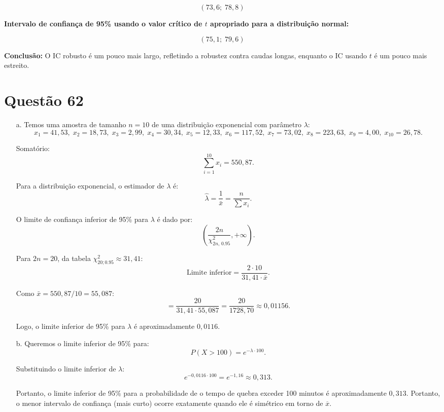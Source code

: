 \documentclass[12pt]{article}
\newcommand{\quest}[1]{\section*{Questão #1}} %
\begin{document}
\[
(73,6;\; 78,8)
\]

\textbf{Intervalo de confiança de 95\% usando o valor crítico de \(t\) apropriado para a distribuição normal:}

\[
(75,1;\; 79,6)
\]

\textbf{Conclusão:} O IC robusto é um pouco mais largo, refletindo a robustez contra caudas longas, enquanto o IC usando \(t\) é um pouco mais estreito.


\quest{62}

\begin{enumerate}
    \item[a.] Temos uma amostra de tamanho \(n=10\) de uma distribuição exponencial com parâmetro \(\lambda\):
    \[
    x_1=41,53,\; x_2=18,73,\; x_3=2,99,\; x_4=30,34,\; x_5=12,33,\; 
    x_6=117,52,\; x_7=73,02,\; x_8=223,63,\; x_9=4,00,\; x_{10}=26,78.
    \]
    
    Somatório:
    \[
    \sum_{i=1}^{10} x_i = 550,87.
    \]
    
    Para a distribuição exponencial, o estimador de \(\lambda\) é:
    \[
    \hat{\lambda} = \frac{1}{\bar{x}} = \frac{n}{\sum x_i}.
    \]
    
    O limite de confiança inferior de 95\% para \(\lambda\) é dado por:
    \[
    \left( \frac{2n}{\chi^2_{2n,\,0.95}} , +\infty \right).
    \]
    
    Para \(2n=20\), da tabela \(\chi^2_{20;0.95} \approx 31,41\):
    \[
    \text{Limite inferior} = \frac{2 \cdot 10}{31,41 \cdot \bar{x}}.
    \]
    
    Como \(\bar{x} = 550,87/10 = 55,087\):
    \[
    = \frac{20}{31,41 \cdot 55,087} 
    = \frac{20}{1728,70} 
    \approx 0,01156.
    \]
    
    Logo, o limite inferior de 95\% para \(\lambda\) é aproximadamente \(0,0116\).
    
    \item[b.] Queremos o limite inferior de 95\% para:
    \[
    P(X>100) = e^{-\lambda \cdot 100}.
    \]
    
    Substituindo o limite inferior de \(\lambda\):
    \[
    e^{-0,0116 \cdot 100} = e^{-1,16} \approx 0,313.
    \]
    
    Portanto, o limite inferior de 95\% para a probabilidade de o tempo de quebra exceder 100 minutos é aproximadamente \(0,313\).
    Portanto, o menor intervalo de confiança (mais curto) ocorre exatamente quando ele é simétrico em torno de \(\overline{x}\).
\end{enumerate}
\end{document}
